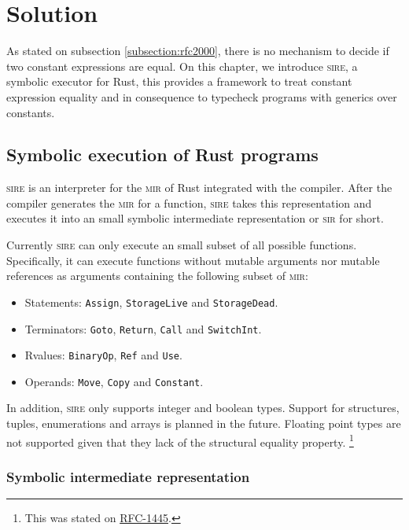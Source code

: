 \chapter{Solution}
\label{chapter:solution}

As stated on subsection \ref{subsection:rfc2000}, there is no mechanism to
decide if two constant expressions are equal. On this chapter,
we introduce \textsc{sire}, a symbolic executor for Rust, this provides a
framework to treat constant expression equality and in consequence to typecheck
programs with generics over constants. 

\section{Symbolic execution of Rust programs}

\textsc{sire} is an interpreter for the \textsc{mir} of Rust integrated with
the compiler. After the compiler generates the \textsc{mir}
for a function, \textsc{sire} takes this representation and executes it into
an small symbolic intermediate representation or \textsc{sir} for short.

Currently \textsc{sire} can only execute an small subset of all possible
functions. Specifically, it can execute functions without mutable arguments nor
mutable references as arguments containing the following subset of \textsc{mir}:
\begin{itemize}
    \item Statements: \texttt{Assign}, \texttt{StorageLive} and \texttt{StorageDead}.
    \item Terminators: \texttt{Goto}, \texttt{Return}, \texttt{Call} and \texttt{SwitchInt}.
    \item Rvalues: \texttt{BinaryOp}, \texttt{Ref} and \texttt{Use}.
    \item Operands: \texttt{Move}, \texttt{Copy} and \texttt{Constant}.
\end{itemize}

In addition, \textsc{sire} only supports integer and boolean types. Support for
structures, tuples, enumerations and arrays is planned in the future. Floating
point types are not supported given that they lack of the structural equality
property. \footnote{This was stated on
\href{https://github.com/rust-lang/rfcs/blob/master/text/1445-restrict-constants-in-patterns.md}{RFC-1445}.}


\subsection{Symbolic intermediate representation}

